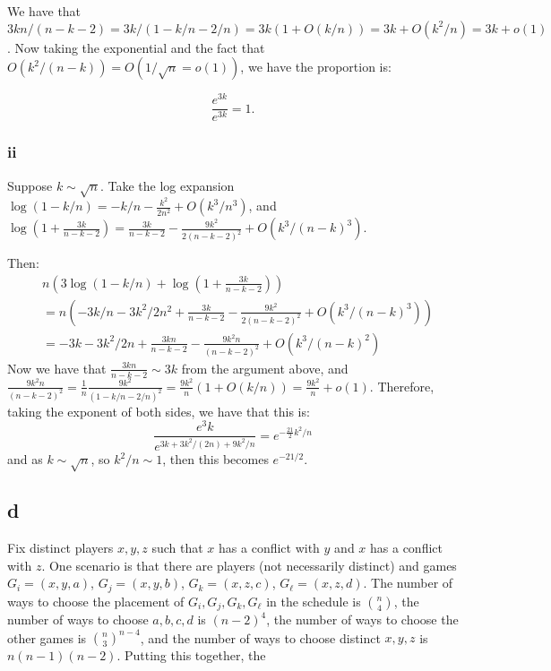 \documentclass[]{article}
\theoremstyle{definition}
\numberwithin{theorem}{section}
\numberwithin{equation}{section}
\begin{document}
We have that $3kn/(n - k - 2) = 3k/(1 - k/n - 2/n) = 3k(1 + O(k/n)) = 3k + O(k^2/n) =  3k + o(1)$. 
Now taking the exponential and the fact that $O(k^2/(n - k)) = O(1/\sqrt{n} = o(1))$, we have the proportion is:

\begin{equation}
	\frac{e^{3k}}{e^{3k}} = 1. 
\end{equation}

\subsubsection{ii}
Suppose $k \sim \sqrt{n}$. 
Take the log expansion 
$\log(1 - k/n)  = -k/n - \frac{k^2}{2n^2} + O(k^3/n^3)$, and $\log\left(1 + \frac{3k}{n - k - 2}\right) = \frac{3k}{n - k - 2} - \frac{9k^2}{2(n - k - 2)^2} + O(k^3/(n - k)^3)$. 

Then:
\begin{align*}
	&n \left( 3 \log(1 - k/n) + \log\left(1 + \frac{3k}{n - k - 2}\right)\right) \\
	&= n \left(-3k/n - 3k^2/2n^2 + \frac{3k}{n - k - 2} - \frac{9k^2}{2(n - k - 2)^2} + O(k^3/(n - k)^3)\right)\\
	&= -3k - 3k^2/2n + \frac{3kn}{n - k - 2} - \frac{9k^2 n}{(n - k - 2)^2} + O(k^3/(n - k)^2)
\end{align*}
Now we have that $\frac{3kn}{n - k - 2}  \sim 3k$ from the argument above, and $\frac{9k^2 n}{(n - k - 2)^2} = \frac{1}{n} \frac{9 k^2}{(1 - k/n - 2/n)^2} = \frac{9k^2}{n}(1 + O(k/n)) = \frac{9k^2}{n} + o(1)$. Therefore, taking the exponent of both sides, we have that this is:
\begin{equation}
	\frac{e^3k }{e^{3k + 3k^2/(2n) + 9k^2/n}} = e^{-\frac{21}{2} k^2/n}
\end{equation}
and as $k \sim \sqrt{n}$, so $k^2/n \sim 1$, then this becomes $e^{-21/2}$. 

\subsection{d}
Fix distinct players $x, y, z$ such that $x$ has a conflict with $y$ and $x$ has a conflict with $z$. One scenario is that there are players (not necessarily distinct) and games $G_i = (x, y, a)$, $G_j = (x, y, b)$, $G_k = (x, z, c)$, $G_\ell = (x, z, d)$. 
The number of ways to choose the placement of $G_i, G_j, G_k, G_\ell$ in the schedule is $\binom{n}{4}$, the number of ways to choose $a, b, c, d$ is $(n - 2)^4$, the number of ways to choose the other games is $\binom{n}{3}^{n - 4}$, and the number of ways to choose distinct $x, y, z$ is $n(n - 1)(n-2)$. Putting this together, the 
\end{document}
